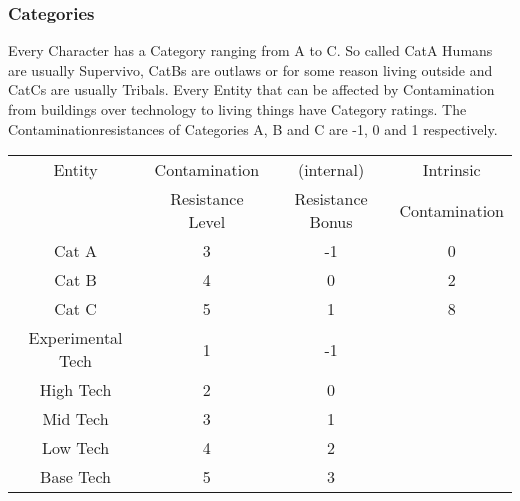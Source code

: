     \subsubsection{Categories}
    Every Character has a Category ranging from A to C. So called CatA Humans are usually Supervivo, CatBs are outlaws or
    for some reason living outside and CatCs are usually Tribals.
    Every Entity that can be affected by Contamination from buildings over technology to living things have Category ratings.
    The Contaminationresistances of Categories A, B and C are -1, 0 and 1 respectively.\par\vspace{1.5cm}
    \begin{tabular}{c|ccc}
        Entity & Contamination  & (internal) & Intrinsic\\
               & Resistance Level & Resistance Bonus & Contamination\\
        Cat A & 3 & -1 & 0\\
        Cat B & 4 & 0 & 2\\
        Cat C & 5 & 1 & 8\\
        Experimental Tech & 1 & -1 \\
        High Tech & 2 & 0 \\
        Mid Tech & 3 & 1\\
        Low Tech & 4 & 2 \\
        Base Tech & 5 & 3 \\
    \end{tabular}\par\vspace{1.5cm}
